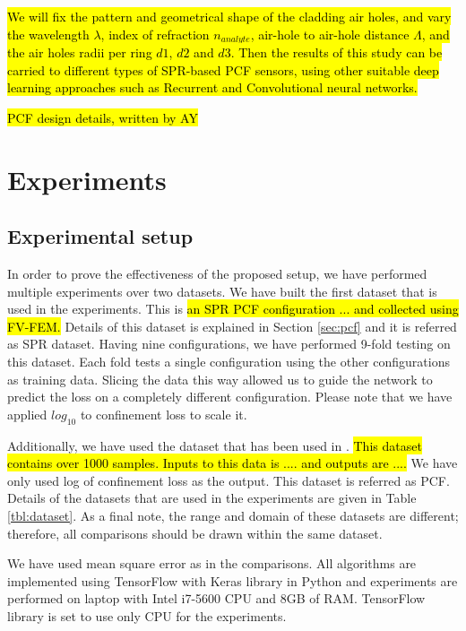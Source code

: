 \documentclass[draft, 10pt]{IEEEtran}
\begin{document}
\hl{We will fix the pattern and geometrical shape of the cladding air holes, and vary the wavelength $\lambda$, index of refraction $n_{analyte} $, air-hole to air-hole distance $ \Lambda $, and the air holes radii per ring $d1$, $d2$ and $d3$. Then the results of this study can be carried to different types of SPR-based PCF sensors, using other suitable deep learning approaches such as Recurrent and Convolutional neural networks. }

\hl{PCF design details, written by AY}

\section{Experiments}
\label{sec:exp}

\subsection{Experimental setup}

\def\dszero{PCF}

In order to prove the effectiveness of the proposed setup, we have performed multiple experiments over two datasets. We have built the first dataset that is used in the experiments. This is \hl{an SPR PCF configuration ... and collected using FV-FEM.} Details of this dataset is explained in Section \ref{sec:pcf} and it is referred as SPR dataset. Having nine configurations, we have performed 9-fold testing on this dataset. Each fold tests a single configuration using the other configurations as training data. Slicing the data this way allowed us to guide the network to predict the loss on a completely different configuration. Please note that we have applied $log_{10}$ to confinement loss to scale it.

Additionally, we have used the dataset that has been used in \cite{paper0}. \hl{This dataset contains over 1000 samples. Inputs to this data is .... and outputs are ....} We have only used log of confinement loss as the output. This dataset is referred as \dszero. Details of the datasets that are used in the experiments are given in Table \ref{tbl:dataset}. As a final note, the range and domain of these datasets are different; therefore, all comparisons should be drawn within the same dataset.

We have used mean square error as in the comparisons. All algorithms are implemented using TensorFlow with Keras library in Python and experiments are performed on laptop with Intel i7-5600 CPU and 8GB of RAM. TensorFlow library is set to use only CPU for the experiments.
\end{document}
